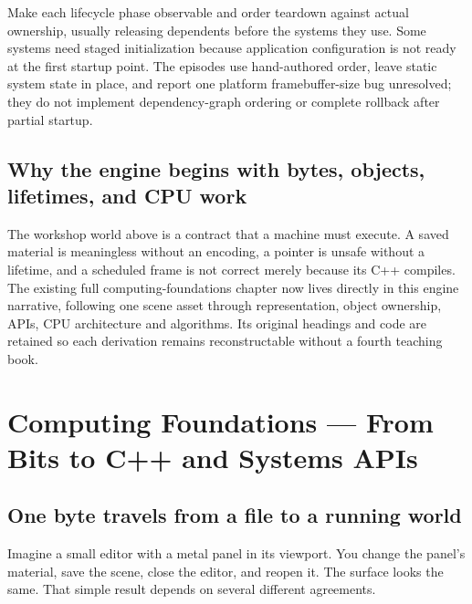 Make each lifecycle phase observable and order teardown against actual ownership, usually releasing dependents before the systems they use. Some systems need staged initialization because application configuration is not ready at the first startup point. The episodes use hand-authored order, leave static system state in place, and report one platform framebuffer-size bug unresolved; they do not implement dependency-graph ordering or complete rollback after partial startup.

\subsection{Why the engine begins with bytes, objects, lifetimes, and CPU work}\label{05-engine-i-ch001-why-the-engine-begins-with-bytes-objects-lifetimes-and-cpu-work}

\hypertarget{05-engine-i-ch001-why-the-engine-begins-with-bytes-objects-lifetimes-and-cpu-work}{}

The workshop world above is a contract that a machine must execute. A saved material is meaningless without an encoding, a pointer is unsafe without a lifetime, and a scheduled frame is not correct merely because its C++ compiles. The existing full computing-foundations chapter now lives directly in this engine narrative, following one scene asset through representation, object ownership, APIs, CPU architecture and algorithms. Its original headings and code are retained so each derivation remains reconstructable without a fourth teaching book.

\section{Computing Foundations --- From Bits to C++ and Systems APIs}\label{05-engine-i-ch001-computing-foundations-from-bits-to-c-and-systems-apis}

\hypertarget{05-engine-i-ch001-computing-foundations-from-bits-to-c-and-systems-apis}{}

\subsection{One byte travels from a file to a running world}\label{05-engine-i-ch001-one-byte-travels-from-a-file-to-a-running-world}

\hypertarget{05-engine-i-ch001-one-byte-travels-from-a-file-to-a-running-world}{}

Imagine a small editor with a metal panel in its viewport. You change the panel's material, save the scene, close the editor, and reopen it. The surface looks the same. That simple result depends on several different agreements.

